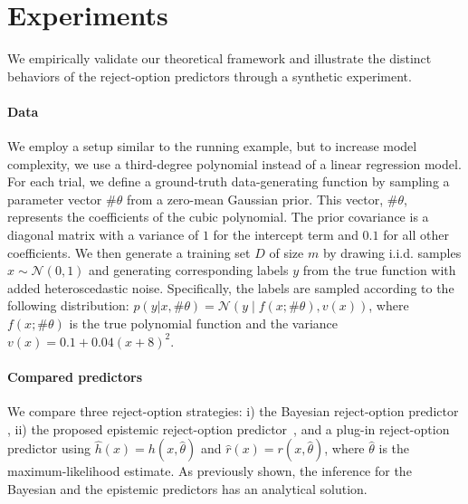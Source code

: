 \section{Experiments}
We empirically validate our theoretical framework and illustrate the distinct behaviors of the reject-option predictors through a synthetic experiment.

\paragraph{Data} We employ a setup similar to the running example, but to increase model complexity, we use a third-degree polynomial instead of a linear regression model. For each trial, we define a ground-truth data-generating function by sampling a parameter vector $\#\theta$ from a zero-mean Gaussian prior. This vector, $\#\theta$, represents the coefficients of the cubic polynomial. The prior covariance is a diagonal matrix with a variance of $1$ for the intercept term and $0.1$ for all other coefficients. We then generate a training set $D$ of size $m$ by drawing i.i.d. samples $x \sim \mathcal{N}(0, 1)$ and generating corresponding labels $y$ from the true function with added heteroscedastic noise. Specifically, the labels are sampled according to the following distribution: $p(y|x, \#\theta) = \mathcal{N}( y\mid f(x; \#\theta), v(x))$, where $f(x; \#\theta)$ is the true polynomial function and the variance $v(x) = 0.1 + 0.04(x + 8)^2$.


\paragraph{Compared predictors} We compare three reject-option strategies:
i) the Bayesian reject-option predictor , ii)
the proposed epistemic reject-option predictor~, and a plug-in reject-option predictor using $\hat{h}(x) = h(x, \hat{\theta})$ and $\hat{r}(x) = r(x, \hat{\theta})$, where $\hat{\theta}$ is the maximum-likelihood estimate.
As previously shown, the inference for the Bayesian and the epistemic predictors has an analytical solution.



